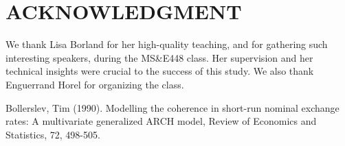 \documentclass[letterpaper, 10 pt, conference]{ieeeconf}  %
\begin{document}








\section*{ACKNOWLEDGMENT}

We thank Lisa Borland for her high-quality teaching, and for gathering such interesting speakers, during the MS\&E448 class. Her supervision and her technical insights were crucial to the success of this study. We also thank Enguerrand Horel for organizing the class. 




\begin{thebibliography}{99}

 Bollerslev, Tim (1990). Modelling the coherence in short-run nominal exchange rates: A multivariate generalized ARCH model, Review of Economics and Statistics, 72, 498-505. 






\end{thebibliography}

\pagebreak
\end{document}

